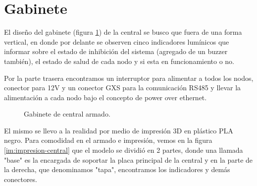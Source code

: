 \section{Gabinete}
\par El diseño del gabinete (figura \ref{im:gabinete-central}) de la central se busco que fuera de 
una forma vertical, en donde por delante se observen cinco indicadores lumínicos que informar sobre
 el estado de inhibición del sistema (agregado de un buzzer también), el estado de salud de cada nodo
  y si esta en funcionamiento o no.
\par Por la parte trasera encontramos un interruptor para alimentar a todos los nodos, conector para
 12V y un conector GXS para la comunicación RS485 y llevar la alimentación a cada nodo bajo el 
 concepto de power over ethernet. 
\begin{figure}[!h]
\begin{center}
    \caption{Gabinete de central armado.}
	\label{im:gabinete-central}
\end{center}
\end{figure}

\par El mismo se llevo a la realidad por medio de impresión 3D en plástico PLA negro. Para comodidad
 en el armado e impresión, vemos en la figura \ref{im:impresion-central} que el modelo se dividió 
 en 2 partes, donde una llamada "base" es la encargada de soportar la placa principal de la central 
 y en la parte de la derecha, que denominamos "tapa", encontramos los indicadores y demás conectores.
 

